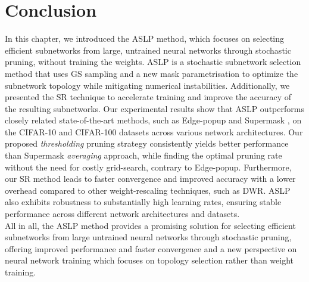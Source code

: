 \section{Conclusion}\label{sec:chap2:conclusion}

In this chapter, we introduced the \acl{ASLP} method, which focuses on selecting
efficient subnetworks from large, untrained neural networks through stochastic
pruning, without training the weights. \acl{ASLP} is a stochastic subnetwork
selection method that uses \acl{GS} sampling and a new mask parametrisation to
optimize the subnetwork topology while mitigating numerical instabilities.
Additionally, we presented the \acl{SR} technique to accelerate training and
improve the accuracy of the resulting subnetworks. Our experimental results show
that \ac{ASLP} outperforms closely related state-of-the-art methods, such as
Edge-popup \cite{DBLP:conf/cvpr/RamanujanWKFR20} and Supermask
\cite{DBLP:conf/nips/ZhouLLY19}, on the CIFAR-10 and CIFAR-100 datasets across
various network architectures. Our proposed \textit{thresholding} pruning
strategy consistently yields better performance than Supermask
\textit{averaging} approach, while finding the optimal pruning rate without the
need for costly grid-search, contrary to Edge-popup. Furthermore, our \acl{SR}
method leads to faster convergence and improved accuracy with a lower overhead
compared to other weight-rescaling techniques, such as \acl{DWR}. \acl{ASLP}
also exhibits robustness to substantially high learning rates, ensuring stable
performance across different network architectures and datasets.\\

All in all, the \acl{ASLP} method provides a promising solution for selecting
efficient subnetworks from large untrained neural networks through stochastic
pruning, offering improved performance and faster convergence and a new
perspective on neural network training which focuses on topology selection
rather than weight training.


